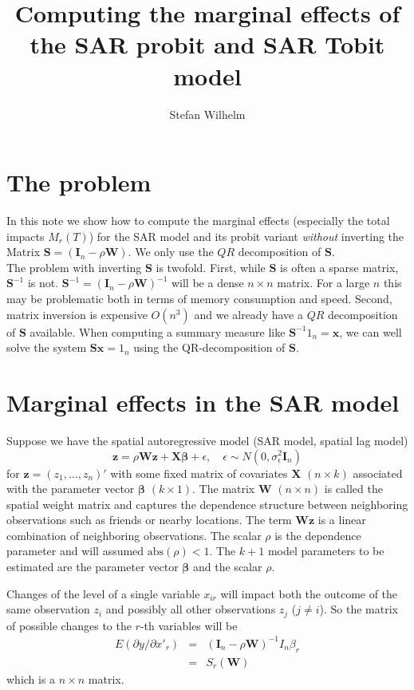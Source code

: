 \documentclass[a4paper]{article}
\title{Computing the marginal effects of the SAR probit and SAR Tobit model}
\author{Stefan Wilhelm}
\def\bfx{\mbox{$\boldsymbol{\mathbf{x}}$}}
\def\bfz{\mbox{$\boldsymbol{\mathbf{z}}$}}
\def\bfbeta{\mbox{$\boldsymbol{\beta}$}}
\def\bfI{\mbox{$\boldsymbol{\mathbf{I}}$}}
\def\bfS{\mbox{$\boldsymbol{\mathbf{S}}$}}
\def\bfW{\mbox{$\boldsymbol{\mathbf{W}}$}}
\def\bfX{\mbox{$\boldsymbol{\mathbf{X}}$}}
\begin{document}
\maketitle

\section{The problem}
In this note we show how to compute the marginal effects (especially the total impacts $M_r(T)$)
for the SAR model and its probit variant \textit{without} inverting the Matrix $\bfS=(\bfI_n - \rho \bfW)$.
We only use the $QR$ decomposition of $\bfS$.\\
The problem with inverting $\bfS$ is twofold. 
First, while $\bfS$ is often a sparse matrix, $\bfS^{-1}$ is not. $\bfS^{-1}=(\bfI_n - \rho \bfW)^{-1}$ will be a dense
$n \times n$ matrix. For a large $n$ this may be problematic both in terms of memory consumption and speed.
Second, matrix inversion is expensive $O(n^3)$ and we already have a $QR$ decomposition of $\bfS$ available.
When computing a summary measure like $\bfS^{-1} 1_n=\bfx$, we can well solve the system $\bfS \bfx = 1_n$ using the QR-decomposition
of $\bfS$.  

\section{Marginal effects in the SAR model}

Suppose we have the spatial autoregressive model (SAR model, spatial lag model) 
\begin{equation}
  \bfz = \rho \bfW \bfz + \bfX \bfbeta + \epsilon, \quad \epsilon \sim N\left(0, \sigma^2_\epsilon \bfI_n\right)
  \label{eqn:sarprobit}
\end{equation}
for $\bfz = (z_1,\ldots,z_n)'$ with some fixed matrix of covariates $\bfX$ $(n \times k)$ 
associated with the parameter vector $\bfbeta$ $(k \times 1)$. 
The matrix $\bfW$ $(n \times n)$ is called the spatial weight matrix and 
captures the dependence structure between neighboring observations
such as friends or nearby locations. 
The term $\bfW \bfz$ is a linear combination of neighboring observations.
The scalar $\rho$ is the dependence parameter and will assumed $\text{abs}{(\rho)} < 1$.
The $k+1$ model parameters to be estimated are the parameter vector $\bfbeta$ and the scalar $\rho$.

Changes of the level of a single variable $x_{ir}$ will impact both the outcome of the same observation $z_i$ and possibly all other
observations $z_j$ ($j \ne i$). So the matrix of possible changes to the $r$-th variables will be
\begin{eqnarray}
E(\partial y / \partial x'_r) & = & (\bfI_n - \rho \bfW)^{-1} I_n \beta_r \\
                              & = & S_r(\bfW) \nonumber
\end{eqnarray}
which is a $n \times n$ matrix.
\end{document}
